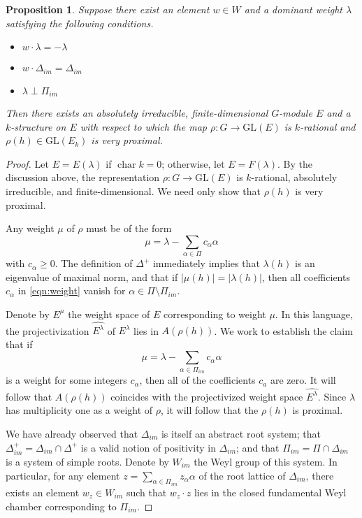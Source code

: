 \documentclass{amsart}
\theoremstyle{plain}
\newtheorem{proposition}[theorem]{Proposition}
\theoremstyle{definition}
\theoremstyle{remark}
\providecommand{\abs}[1]{\lvert#1\rvert}
\begin{document}
\begin{proposition}\label{prop:key}
Suppose there exist an element
$w \in W$ and a dominant weight $\lambda$ satisfying the following conditions.
\begin{itemize}
\item[(i)] $w\cdot\lambda = -\lambda$
\item[(ii)] $w\cdot\Delta_{im}=\Delta_{im}$
\item[(iii)] $\lambda \perp \Pi_{im}$
\end{itemize}
Then there exists an absolutely irreducible, finite-dimensional
$G$-module $E$ and a
$k$-structure on $E$ with respect to which the map
$\rho:G \to \mathrm{GL}(E)$ is $k$-rational and 
$\rho(h) \in \mathrm{GL}(E_{k})$ is very proximal.
\end{proposition}
\begin{proof}
Let $E = E(\lambda)$ if $\operatorname{char} k = 0$; otherwise, let $E = F(\lambda)$. By the
discussion above, the representation $\rho: G \to \mathrm{GL}(E)$ is $k$-rational,
absolutely irreducible, and finite-dimensional.
We need only show that $\rho(h)$ is very proximal.

Any weight $\mu$ of $\rho$ must be of the form
\begin{equation}\label{eqn:weight}
\mu = \lambda - \sum_{\alpha \in \Pi} c_{\alpha} \alpha
\end{equation}
with $c_{\alpha} \geqslant 0$.
The definition of $\Delta^{+}$ immediately implies that $\lambda(h)$
is an eigenvalue of maximal norm, and that if $\abs{\mu(h)} =
\abs{\lambda(h)}$, then all coefficients $c_{\alpha}$ in \eqref{eqn:weight} vanish
for $\alpha \in \Pi \setminus \Pi_{im}$.

Denote by $E^{\mu}$ 
the weight space of $E$ corresponding to weight $\mu$. In this language, the
projectivization $\widehat{E^{\lambda}}$ of $E^{\lambda}$ lies in $A(\rho(h))$. We work to
establish the claim that if
\begin{equation}\label{eqn:maxeigs}
\mu = \lambda - \!\!\!\sum_{\alpha \in \Pi_{im}}\!\!\! c_{\alpha} \alpha
\end{equation}
is a weight for some integers $c_{\alpha}$, then all of the coefficients
$c_{a}$ are zero. It will follow
that $A(\rho(h))$ coincides with the projectivized weight space $\widehat{E^{\lambda}}$. Since $\lambda$
has multiplicity one as a weight of $\rho$, it will follow that the $\rho(h)$ is
proximal.

We have already observed that $\Delta_{im}$ is itself an abstract root system; that
$\Delta^{+}_{im} = \Delta_{im} \cap \Delta^{+}$ is a valid notion of positivity in $\Delta_{im}$;
and that $\Pi_{im} = \Pi \cap \Delta_{im}$ is a system of simple roots. Denote
by $W_{im}$ the Weyl group of this system. In particular, for any element $z = \sum_{\alpha \in \Pi_{im}} z_{\alpha}
\alpha$
of the root lattice of $\Delta_{im}$, there exists an element $w_{z} \in W_{im}$ such
that $w_{z}\cdot z$ lies in the closed fundamental Weyl chamber corresponding to
$\Pi_{im}$.


\end{proof}
\end{document}
